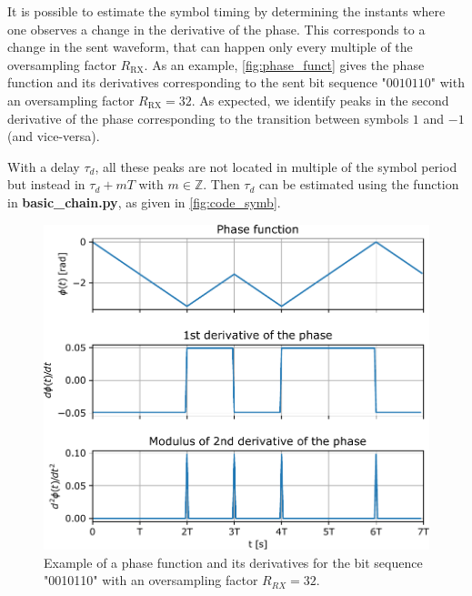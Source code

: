It is possible to estimate the symbol timing by determining the instants where one observes a change in the derivative of the phase. This corresponds to a change in the sent waveform, that can happen only every multiple of the oversampling factor $R_{\text{RX}}$. As an example, \autoref{fig:phase_funct} gives the phase function and its derivatives corresponding to the sent bit sequence "$0010110$" with an oversampling factor $R_{\text{RX}}=32$. As expected, we identify peaks in the second derivative of the phase corresponding to the transition between symbols $1$ and $-1$ (and vice-versa).

With a delay $\tau_d$, all these peaks are not located in multiple of the symbol period but instead in $\tau_d+m T$ with $m\in \mathbb{Z}$. Then $\tau_d$ can be estimated using the function  in \textbf{basic\_chain.py}, as given in \autoref{fig:code_symb}.

\begin{figure}[H]
    \centering
    \includegraphics[scale=0.75]{figures/phase_function_bis.pdf}
    \caption{Example of a phase function and its derivatives for the bit sequence "0010110" with an oversampling factor $R_{RX}=32$.}
    \label{fig:phase_funct}
\end{figure}




